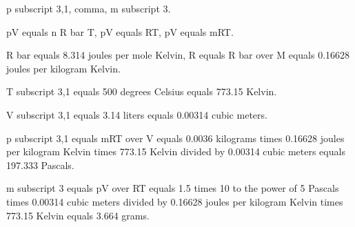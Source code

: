p subscript 3,1, comma, m subscript 3.

pV equals n R bar T, pV equals RT, pV equals mRT.

R bar equals 8.314 joules per mole Kelvin, R equals R bar over M equals 0.16628 joules per kilogram Kelvin.

T subscript 3,1 equals 500 degrees Celsius equals 773.15 Kelvin.

V subscript 3,1 equals 3.14 liters equals 0.00314 cubic meters.

p subscript 3,1 equals mRT over V equals 0.0036 kilograms times 0.16628 joules per kilogram Kelvin times 773.15 Kelvin divided by 0.00314 cubic meters equals 197.333 Pascals.

m subscript 3 equals pV over RT equals 1.5 times 10 to the power of 5 Pascals times 0.00314 cubic meters divided by 0.16628 joules per kilogram Kelvin times 773.15 Kelvin equals 3.664 grams.